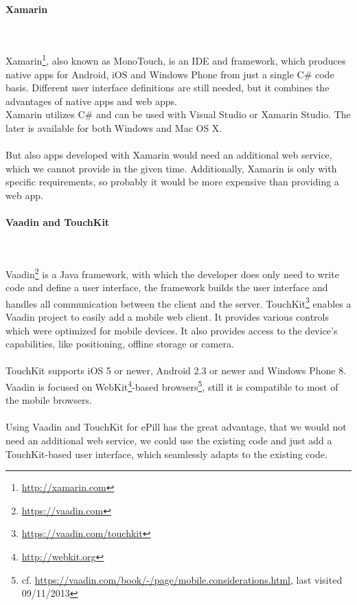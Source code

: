 \paragraph{Xamarin}$\;$

\vspace{0.75em}
Xamarin\footnote{\url{http://xamarin.com}}, also known as MonoTouch, is an IDE and framework, which produces native apps for Android, iOS and Windows Phone from just a single C\# code basis. Different user interface definitions are still needed, but it combines the advantages of native apps and web apps. 
\\
Xamarin utilizes C\# and can be used with Visual Studio or Xamarin Studio. The later is available for both Windows and Mac OS X.
\\
\\
But also apps developed with Xamarin would need an additional web service, which we cannot provide in the given time. Additionally, Xamarin is only with specific requirements, so probably it would be more expensive than providing a web app.

\paragraph{Vaadin and TouchKit}$\;$

\vspace{0.75em}
Vaadin\footnote{\url{https://vaadin.com}} is a Java framework, with which the developer does only need to write code and define a user interface, the framework builds the user interface and handles all communication between the client and the server. TouchKit\footnote{\url{https://vaadin.com/touchkit}} enables a Vaadin project to easily add a mobile web client. It provides various controls which were optimized for mobile devices. It also provides access to the device's capabilities, like positioning, offline storage or camera.
\\
\\
TouchKit supports iOS 5 or newer, Android 2.3 or newer and Windows Phone 8. Vaadin is focused on WebKit\footnote{\url{http://webkit.org}}-based browsers\footnote{cf. \url{https://vaadin.com/book/-/page/mobile.considerations.html}, last visited 09/11/2013}, still it is compatible to most of the mobile browsers.
\\
\\
Using Vaadin and TouchKit for ePill has the great advantage, that we would not need an additional web service, we could use the existing code and just add a TouchKit-based user interface, which seamlessly adapts to the existing code.

